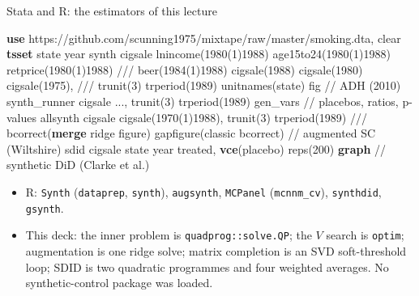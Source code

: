 \documentclass[
  11pt,
  ignorenonframetext,
  aspectratio=169,
]{beamer}
\newenvironment{Shaded}{\begin{snugshade}}{\end{snugshade}}
\newcommand{\CommentTok}[1]{\textcolor[rgb]{0.37,0.37,0.37}{#1}}
\newcommand{\FunctionTok}[1]{\textcolor[rgb]{0.28,0.35,0.67}{#1}}
\newcommand{\KeywordTok}[1]{\textcolor[rgb]{0.00,0.23,0.31}{\textbf{#1}}}
\newcommand{\NormalTok}[1]{\textcolor[rgb]{0.00,0.23,0.31}{#1}}
\providecommand{\tightlist}{%
  \setlength{\itemsep}{0pt}\setlength{\parskip}{0pt}}
\begin{document}
\begin{frame}[fragile]{Stata and R: the estimators of this lecture}
\protect{}\label{stata-and-r-the-estimators-of-this-lecture}
\begin{Shaded}
\begin{Highlighting}[]
\KeywordTok{use}\NormalTok{ https:}\CommentTok{//github.com/scunning1975/mixtape/raw/master/smoking.dta, clear}
\KeywordTok{tsset}\NormalTok{ state }\FunctionTok{year}
\NormalTok{synth cigsale lnincome(1980(1)1988) age15to24(1980(1)1988) retprice(1980(1)1988) }\CommentTok{///}
\NormalTok{    beer(1984(1)1988) cigsale(1988) cigsale(1980) cigsale(1975), }\CommentTok{///}
\NormalTok{    trunit(3) trperiod(1989) unitnames(state) fig            }\CommentTok{// ADH (2010)}
\NormalTok{synth\_runner cigsale ..., trunit(3) trperiod(1989) gen\_vars  }\CommentTok{// placebos, ratios, p{-}values}
\NormalTok{allsynth cigsale cigsale(1970(1)1988), trunit(3) trperiod(1989) }\CommentTok{///}
\NormalTok{    bcorrect(}\KeywordTok{merge}\NormalTok{ ridge figure) gapfigure(classic bcorrect)    }\CommentTok{// augmented SC (Wiltshire)}
\NormalTok{sdid cigsale state }\FunctionTok{year}\NormalTok{ treated, }\KeywordTok{vce}\NormalTok{(placebo) reps(200) }\KeywordTok{graph}  \CommentTok{// synthetic DiD (Clarke et al.)}
\end{Highlighting}
\end{Shaded}

\begin{itemize}
\tightlist
\item
  R: \texttt{Synth} (\texttt{dataprep}, \texttt{synth}),
  \texttt{augsynth}, \texttt{MCPanel} (\texttt{mcnnm\_cv}),
  \texttt{synthdid}, \texttt{gsynth}.
\item
  This deck: the inner problem is \texttt{quadprog::solve.QP}; the \(V\)
  search is \texttt{optim}; augmentation is one ridge solve; matrix
  completion is an SVD soft-threshold loop; SDID is two quadratic
  programmes and four weighted averages. No synthetic-control package
  was loaded.
\end{itemize}
\end{frame}
\end{document}
